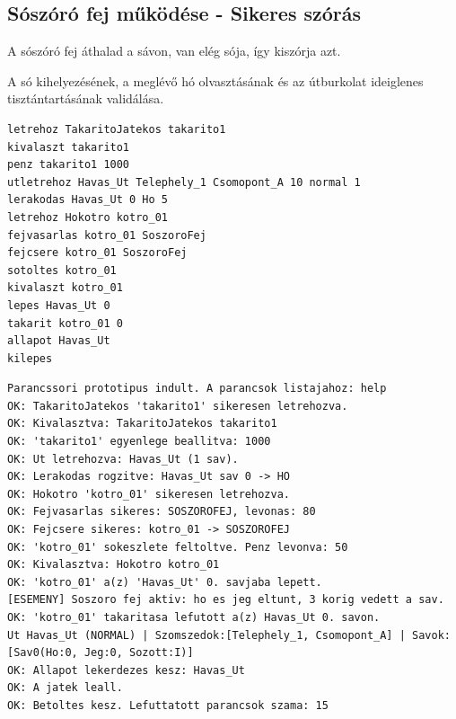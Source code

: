 \subsection{Sószóró fej működése - Sikeres szórás}
\begin{test-case-description}
    A sószóró fej áthalad a sávon, van elég sója, így kiszórja azt.
\end{test-case-description}
\begin{test-case-function}
    A só kihelyezésének, a meglévő hó olvasztásának és az útburkolat ideiglenes tisztántartásának validálása.
\end{test-case-function}
\begin{test-case-input}
\begin{verbatim}
letrehoz TakaritoJatekos takarito1
kivalaszt takarito1
penz takarito1 1000
utletrehoz Havas_Ut Telephely_1 Csomopont_A 10 normal 1
lerakodas Havas_Ut 0 Ho 5
letrehoz Hokotro kotro_01
fejvasarlas kotro_01 SoszoroFej
fejcsere kotro_01 SoszoroFej
sotoltes kotro_01
kivalaszt kotro_01
lepes Havas_Ut 0
takarit kotro_01 0
allapot Havas_Ut
kilepes
\end{verbatim}
\end{test-case-input}
\begin{test-case-output}
\begin{verbatim}
Parancssori prototipus indult. A parancsok listajahoz: help
OK: TakaritoJatekos 'takarito1' sikeresen letrehozva.
OK: Kivalasztva: TakaritoJatekos takarito1
OK: 'takarito1' egyenlege beallitva: 1000
OK: Ut letrehozva: Havas_Ut (1 sav).
OK: Lerakodas rogzitve: Havas_Ut sav 0 -> HO
OK: Hokotro 'kotro_01' sikeresen letrehozva.
OK: Fejvasarlas sikeres: SOSZOROFEJ, levonas: 80
OK: Fejcsere sikeres: kotro_01 -> SOSZOROFEJ
OK: 'kotro_01' sokeszlete feltoltve. Penz levonva: 50
OK: Kivalasztva: Hokotro kotro_01
OK: 'kotro_01' a(z) 'Havas_Ut' 0. savjaba lepett.
[ESEMENY] Soszoro fej aktiv: ho es jeg eltunt, 3 korig vedett a sav.
OK: 'kotro_01' takaritasa lefutott a(z) Havas_Ut 0. savon.
Ut Havas_Ut (NORMAL) | Szomszedok:[Telephely_1, Csomopont_A] | Savok: [Sav0(Ho:0, Jeg:0, Sozott:I)]
OK: Allapot lekerdezes kesz: Havas_Ut
OK: A jatek leall.
OK: Betoltes kesz. Lefuttatott parancsok szama: 15
\end{verbatim}
\end{test-case-output}

